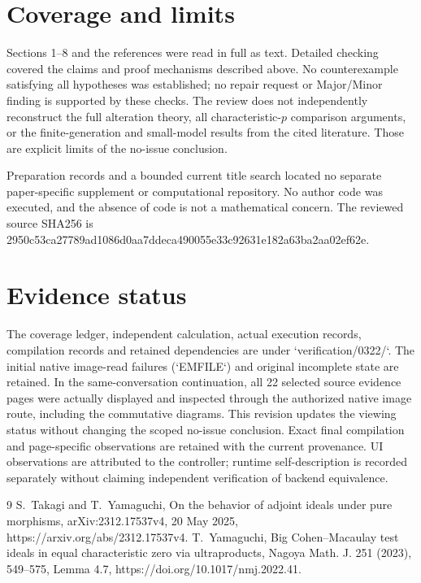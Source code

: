 \documentclass[10pt]{article}
\begin{document}
\section*{Coverage and limits}
Sections 1–8 and the references were read in full as text. Detailed checking covered the claims and proof mechanisms described above. No counterexample satisfying all hypotheses was established; no repair request or Major/Minor finding is supported by these checks. The review does not independently reconstruct the full alteration theory, all characteristic-\(p\) comparison arguments, or the finite-generation and small-model results from the cited literature. Those are explicit limits of the no-issue conclusion.\par
Preparation records and a bounded current title search located no separate paper-specific supplement or computational repository. No author code was executed, and the absence of code is not a mathematical concern. The reviewed source SHA256 is 2950c53ca27789ad1086d0aa7ddeca490055e33c92631e182a63ba2aa02ef62e.\par
\section*{Evidence status}
The coverage ledger, independent calculation, actual execution records, compilation records and retained dependencies are under `verification/0322/`. The initial native image-read failures (`EMFILE`) and original incomplete state are retained. In the same-conversation continuation, all 22 selected source evidence pages were actually displayed and inspected through the authorized native image route, including the commutative diagrams. This revision updates the viewing status without changing the scoped no-issue conclusion. Exact final compilation and page-specific observations are retained with the current provenance. UI observations are attributed to the controller; runtime self-description is recorded separately without claiming independent verification of backend equivalence.\par
9 S. Takagi and T. Yamaguchi, On the behavior of adjoint ideals under pure morphisms, arXiv:2312.17537v4, 20 May 2025, https://arxiv.org/abs/2312.17537v4. T. Yamaguchi, Big Cohen–Macaulay test ideals in equal characteristic zero via ultraproducts, Nagoya Math. J. 251 (2023), 549–575, Lemma 4.7, https://doi.org/10.1017/nmj.2022.41.\par
\end{document}

